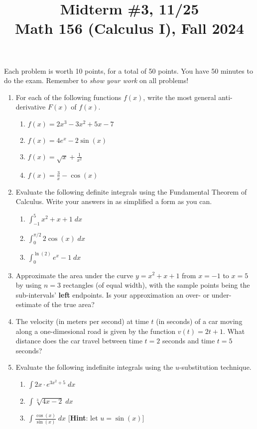 \documentclass[11pt]{article}
\title{Midterm \#3, 11/25 \\ Math 156 (Calculus I), Fall 2024}
\date{}
\begin{document}
\maketitle

\thispagestyle{empty}

\vspace{-1cm}

Each problem is worth 10 points, for a total of 50 points. You have 50 minutes to do the exam. Remember to \emph{show your work} on all problems!

\begin{enumerate}
\item For each of the following functions $f(x)$, write the most general anti-derivative $F(x)$ of $f(x)$.
\begin{enumerate}
\item $f(x)=2x^3 -3x^2+5x-7$
\item $f(x) = 4e^x - 2\sin(x)$
\item $f(x) = \displaystyle \sqrt{x} + \frac{1}{x^2}$
\item $f(x) = \displaystyle \frac{3}{x}-\cos(x)$
\end{enumerate}
\item Evaluate the following definite integrals using the Fundamental Theorem of Calculus. Write your answers in as simplified a form as you can.
\begin{enumerate}
\item $\displaystyle \int_{-1}^{5} x^2+x+1 \; dx$
\item $\displaystyle \int_{0}^{\pi/2} 2\cos(x) \; dx$
\item $\displaystyle \int_{0}^{\ln(2)} e^x - 1 \; dx$
\end{enumerate}
\item Approximate the area under the curve $y=x^2+x+1$ from $x=-1$ to $x=5$ by using $n=3$ rectangles (of equal width), with the sample points being the sub-intervals' {\bf left} endpoints. Is your approximation an over- or under-estimate of the true area?
\item The velocity (in meters per second) at time $t$ (in seconds) of a car moving along a one-dimesional road is given by the function $v(t)=2t+1$. What distance does the car travel between time $t=2$ seconds and time $t=5$ seconds?
\item Evaluate the following indefinite integrals using the $u$-substitution technique.
\begin{enumerate}
\item $\displaystyle \int 2x \cdot e^{3x^2+5} \; dx$
\item $\displaystyle \int \sqrt[3]{4x-2} \; dx$
\item $\displaystyle \int \frac{\cos(x)}{\sin(x)} \; dx$ \hfill [{\bf Hint}: let $u=\sin(x)$]
\end{enumerate}
\end{enumerate}
\end{document}
